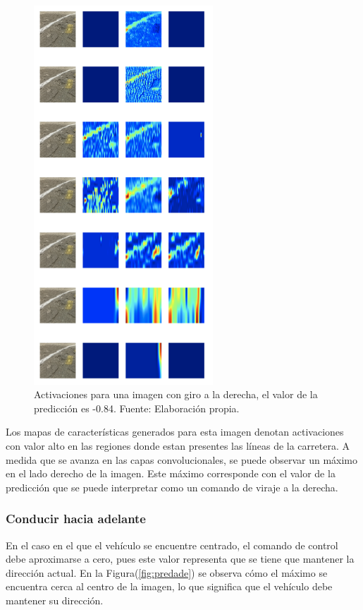         \begin{figure}[!h] 
            \centering
            \includegraphics[width=0.60\textwidth]{img/predder}
            \caption[Activaciones para una imagen con giro a la derecha]{Activaciones para una imagen con giro a la derecha, el valor de 
            la predicción es -0.84. Fuente: Elaboración propia. }
            \label{fig:predder}
        \end{figure}

        Los mapas de características generados para esta imagen denotan activaciones con valor alto en las regiones donde estan 
        presentes las líneas de la carretera. A medida que se avanza en las capas convolucionales, se puede observar un máximo 
        en el lado derecho de la imagen. Este máximo corresponde con el valor de la predicción que se puede interpretar como un comando 
        de viraje a la derecha.


        \subsubsection{Conducir hacia adelante}
        En el caso en el que el vehículo se encuentre centrado, el comando de control debe aproximarse a cero, pues este 
        valor representa que se tiene que mantener la dirección actual. En la Figura(\ref{fig:predade}) se observa cómo el máximo se encuentra 
        cerca al centro de la imagen, lo que significa que el vehículo debe mantener su dirección. 


